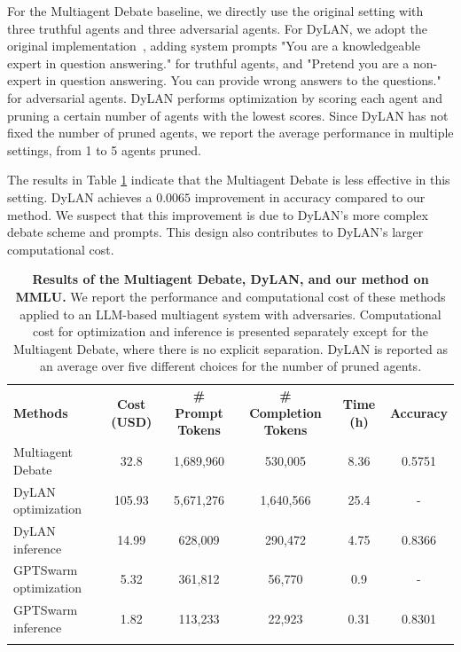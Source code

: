 \documentclass{article}
\theoremstyle{plain}
\theoremstyle{definition}
\theoremstyle{remark}
\begin{document}
For the Multiagent Debate baseline, we directly use the original setting with three truthful agents and three adversarial agents.
For DyLAN, we adopt the original implementation~\citep{liu2023dynamic}, adding system prompts "You are a knowledgeable expert in question answering." for truthful agents, and "Pretend you are a non-expert in question answering. You can provide wrong answers to the questions." for adversarial agents.
DyLAN performs optimization by scoring each agent and pruning a certain number of agents with the lowest scores.
Since DyLAN has not fixed the number of pruned agents, we report the average performance in multiple settings, from 1 to 5 agents pruned.

The results in Table \ref{tab:MMLU} indicate that the Multiagent Debate is less effective in this setting.
DyLAN achieves a $0.0065$ improvement in accuracy compared to our method.
We suspect that this improvement is due to DyLAN's more complex debate scheme and prompts.
This design also contributes to DyLAN's larger computational cost.
\begin{table}[h!]
  \centering
  \caption{\textbf{Results of the Multiagent Debate, DyLAN, and our method on MMLU.}
  We report the performance and computational cost of these methods applied to an LLM-based multiagent system with adversaries.
  Computational cost for optimization and inference is presented separately except for the Multiagent Debate, where there is no explicit separation.
  DyLAN is reported as an average over five different choices for the number of pruned agents.}
  \label{tab:MMLU}

  \renewcommand\tabcolsep{12pt}
  \renewcommand\arraystretch{1.2}
  \footnotesize
  \begin{tabular}{l|ccccc}
    \Xhline{1.2pt}
    \rowcolor{champagne}
    \textbf{Methods} & \textbf{Cost (USD)} & \textbf{\# Prompt Tokens} & \textbf{\# Completion Tokens} & \textbf{Time (h)} & \textbf{Accuracy} 
    \\
    \Xhline{1.2pt}

    Multiagent Debate & 32.8 & 1,689,960 & 530,005 & 8.36 & 0.5751 
    \\
    \rowcolor{gray!10} DyLAN optimization & 105.93 & 5,671,276 & 1,640,566 & 25.4 & - 
    \\
    DyLAN inference & 14.99 & 628,009 & 290,472 & 4.75 & 0.8366 
    \\
    \rowcolor{gray!10} GPTSwarm optimization & 5.32 & 361,812 & 56,770 & 0.9 & - 
    \\
    GPTSwarm inference & 1.82 & 113,233 & 22,923 & 0.31 & 0.8301 
    \\
    \Xhline{1.2pt}
  \end{tabular}
\end{table}
\end{document}
